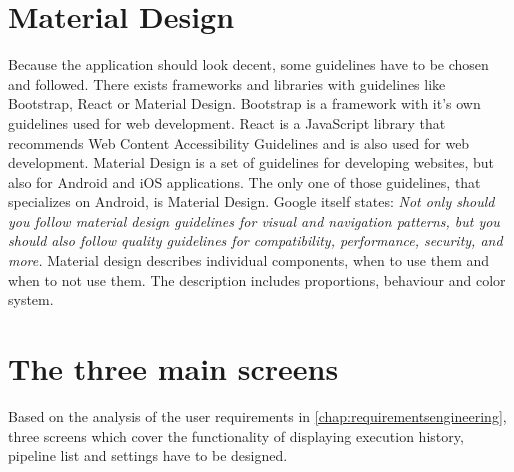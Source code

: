 \section{Material Design}
Because the application should look decent, some guidelines have to be chosen and followed.
There exists frameworks and libraries with guidelines like Bootstrap\cite{bootstrap}, React\cite{react} or Material Design\cite{material}.
Bootstrap is a framework with it's own guidelines used for web development.
React is a JavaScript library that recommends Web Content Accessibility Guidelines\cite{wcag} and is also used for web development.
Material Design is a set of guidelines for developing websites, but also for Android and iOS applications.
The only one of those guidelines, that specializes on Android, is Material Design.
Google itself states: \textit{Not only should you follow material design guidelines for visual and navigation patterns, but you should also follow quality guidelines for compatibility, performance, security, and more.}\cite{design}
Material design describes individual components, when to use them and when to not use them.
The description includes proportions, behaviour and color system.

\section{The three main screens}
Based on the analysis of the user requirements in \autoref{chap:requirementsengineering}, three screens which cover the functionality of displaying execution history, pipeline list and settings have to be designed.

